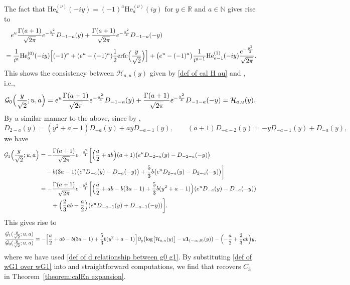 \documentclass[reqno]{amsart}
\newcommand{\1}{\mathds{1}}
\newcommand{\N}{\mathbb{N}}
\newcommand{\R}{\mathds{R}}
\numberwithin{equation}{section}
\theoremstyle{definition}
\begin{document}
The fact that $\mathrm{He}_{a}^{(\nu)}(-iy)=(-1)^a\mathrm{He}_{a}^{(\nu)}(iy)$ for $y\in\R$ and $a\in\N$ gives rise to 
\begin{align*}
&\quad
e^{u}\frac{\Gamma(a+1)}{\sqrt{2\pi}}e^{-\frac{y^2}{4}}D_{-1-a}(y)
+\frac{\Gamma(a+1)}{\sqrt{2\pi}}e^{-\frac{y^2}{4}}D_{-1-a}(-y)
\\
&=
\frac{1}{i^{a}}\mathrm{He}_{a}^{(0)}(-iy)
\Bigl[
(-1)^a+(e^{u}-(-1)^a)\frac{1}{2}\mathrm{erfc}\Bigl(\frac{y}{\sqrt{2}}\Bigr)
\Bigr]
+
\bigl(e^{u}-(-1)^{a}\bigr)\frac{1}{i^{a-1}}\mathrm{He}_{a-1}^{(1)}(-iy)\frac{e^{-\frac{y^2}{2}}}{\sqrt{2\pi}}.
\end{align*}
This shows the consistency between $\mathcal{H}_{a,u}(y)$ given by \eqref{def of cal H au} and \cite[Eq. (1.13)]{BC2022} , i.e., 
\[
\mathcal{G}_{0}\Bigl(\frac{y}{\sqrt{2}};u,a\Bigr)
=
 e^{u}\frac{\Gamma(a+1)}{\sqrt{2\pi}}e^{-\frac{y^2}{4}}D_{-1-a}(y)
+\frac{\Gamma(a+1)}{\sqrt{2\pi}}e^{-\frac{y^2}{4}}D_{-1-a}(-y)
=
\mathcal{H}_{a,u}(y).
\]
By a similar manner to the above, since by \cite[Eq. (12.8.1)]{NIST}, 
\[
D_{2-a}(y)=(y^2+a-1)D_{-a}(y)+ayD_{-a-1}(y), \qquad
(a+1)D_{-a-2}(y)=-yD_{-a-1}(y)+D_{-a}(y), 
\]
we have 
\begin{align*}
\mathcal{G}_{1}\Bigl(\frac{y}{\sqrt{2}};u,a\Bigr)
&=
-\frac{\Gamma(a+1)}{\sqrt{2\pi}}e^{-\frac{y^2}{4}}
\bigg[
\Bigl(\frac{a}{2}+ab \Bigr)(a+1)\bigl(e^{u}D_{-2-a}(y)-D_{-2-a}(-y)\bigr)
\\
&\quad
-b(3a-1)\bigl(e^uD_{-a}(y)-D_{-a}(-y)\bigr)
+\frac{5}{3}b\bigl(e^u D_{2-a}(y)-D_{2-a}(-y)\bigr)
\bigg]
\\
&=
-\frac{\Gamma(a+1)}{\sqrt{2\pi}}e^{-\frac{y^2}{4}}
\bigg[
\Bigl(\frac{a}{2}+ab-b(3a-1)+\frac{5}{3}b(y^2+a-1)\Bigr)
(e^{u}D_{-a}(y)-D_{-a}(-y))
\\
&\qquad
+\Bigl(\frac{2}{3}ab-\frac{a}{2}\Bigr)(e^{u}D_{-a-1}(y)+D_{-a-1}(-y))
\bigg]. 
\end{align*}
This gives rise to 
\begin{equation}
\label{def of wG1 over wG1}
\frac{\mathcal{G}_{1}(\tfrac{y}{\sqrt{2}};u,a)}{\mathcal{G}_{0}(\tfrac{y}{\sqrt{2}};u,a)}
=
-\Bigl[
\frac{a}{2}+ab-b(3a-1)+\frac{5}{3}b(y^2+a-1)
\Bigr]\partial_y\bigl(\log\bigl[\mathcal{H}_{a,u}(y)\bigr]-u\mathbf{1}_{(-\infty,0)}(y)\bigr)
-\Bigl(-\frac{a}{2}+\frac{2}{3}ab\Bigr)y,
\end{equation}
where we have used \eqref{def of d relationship between g0 g1}. 
By substituting \eqref{def of wG1 over wG1} into \cite[$\tfrac{\mathcal{G}_1(y;u,a)}{\mathcal{G}_0(y;u,a)}$ of $C_3$ in Theorem 1.1]{BC2022} and straightforward computations, we find that \cite[$C_3$ in Theorem 1.1]{BC2022} recovers $C_3$ in Theorem~\ref{theorem:calEn expansion}. 
\end{document}
